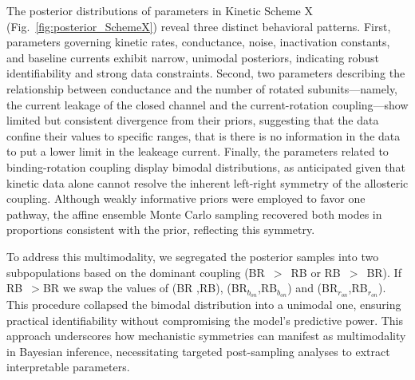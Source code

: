 \documentclass[pdflatex,sn-mathphys-num]{sn-jnl}%
\theoremstyle{thmstyleone}%
\theoremstyle{thmstyletwo}%
\theoremstyle{thmstylethree}%
\begin{document}
The posterior distributions of parameters in Kinetic Scheme X (Fig.~\ref{fig:posterior_SchemeX}) reveal three distinct behavioral patterns. First, parameters governing kinetic rates, conductance, noise, inactivation constants, and baseline currents exhibit narrow, unimodal posteriors, indicating robust identifiability and strong data constraints. Second, two parameters describing the relationship between conductance and the number of rotated subunits---namely, the current leakage of the closed channel and the current-rotation coupling---show limited but consistent divergence from their priors, suggesting that the data confine their values to specific ranges, that is there is no information in the data to put a lower limit in the leakeage current. 
Finally, the parameters related to binding-rotation coupling display bimodal distributions, as anticipated given that kinetic data alone cannot resolve the inherent left-right symmetry of the allosteric coupling. Although weakly informative priors were employed to favor one pathway, the affine ensemble Monte Carlo sampling recovered both modes in proportions consistent with the prior, reflecting this symmetry.

To address this multimodality, we segregated the posterior samples into two subpopulations based on the dominant coupling (BR~$>$~RB or RB~$>$~BR). If RB~$>$BR we swap the values of (BR ,RB), (BR$_{b_{on}}$,RB$_{b_{on}}$) and (BR$_{r_{on}}$,RB$_{r_{on}}$). This procedure collapsed the bimodal distribution into a unimodal one, ensuring practical identifiability without compromising the model's predictive power. This approach underscores how mechanistic symmetries can manifest as multimodality in Bayesian inference, necessitating targeted post-sampling analyses to extract interpretable parameters.
\end{document}
